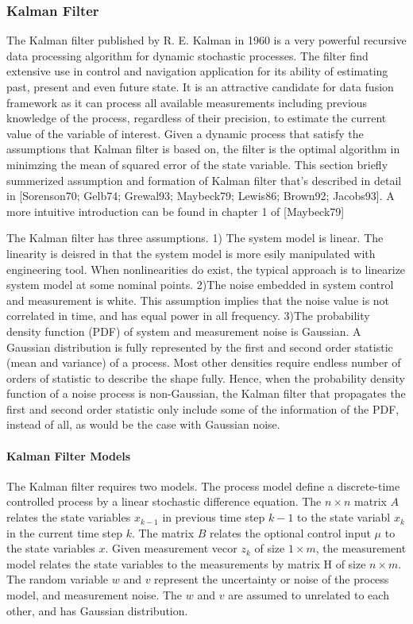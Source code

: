 \subsubsection{Kalman Filter}
The Kalman filter \cite{Kalman's original paper}published by R. E.
Kalman in 1960 is a very powerful recursive data processing algorithm
for dynamic stochastic processes. The filter find extensive use in
control and navigation application for its ability of estimating past,
present and even future state. It is an attractive candidate for data
fusion framework as it can process all available measurements
including previous knowledge of the process, regardless of their
precision, to estimate the current value of the variable of interest.
Given a dynamic process that satisfy the assumptions that Kalman
filter is based on, the filter is the optimal algorithm in minimzing
the mean of squared error of the state variable. This section briefly
summerized assumption and formation of Kalman filter that's described
in detail in \cite{from the following}[Sorenson70; Gelb74; Grewal93;
Maybeck79; Lewis86; Brown92; Jacobs93]. A more intuitive introduction
can be found in chapter 1 of [Maybeck79]

The Kalman filter has three assumptions. 1) The system model is
linear. The linearity is deisred in that the system model is more
esily manipulated with engineering tool. When nonlinearities do exist,
the typical approach is to linearize system model at some nominal
points. 2)The noise embedded in system control and measurement is
white. This assumption implies that the noise value is not correlated
in time, and has equal power in all frequency. 3)The probability
density function (PDF) of system and measurement noise is Gaussian. A
Gaussian distribution is fully represented by the first and second
order statistic (mean and variance) of a process. Most other densities
require endless number of orders of statistic to describe the shape
fully. Hence, when the probability density function of a noise process
is non-Gaussian, the Kalman filter that propagates the first and
second order statistic only include some of the information of the
PDF, instead of all, as would be the case with Gaussian noise.

\paragraph{Kalman Filter Models}
The Kalman filter requires two models. The process model define a
discrete-time controlled process by a linear stochastic difference
equation. The $n\times n$ matrix $A$ relates the state variables
$x_{k-1}$ in previous time step $k-1$ to the state variabl $x_{k}$ in
the current time step $k$. The matrix $B$ relates the optional control
input $\mu$ to the state variables $x$. Given measurement vecor $z_k$
of size $1 \times m$, the measurement model relates the state
variables to the measurements by matrix H of size $n \times m$. The
random variable $w$ and $v$ represent the uncertainty or noise of the
process model, and measurement noise. The $w$ and $v$ are assumed to
unrelated to each other, and has Gaussian distribution.


